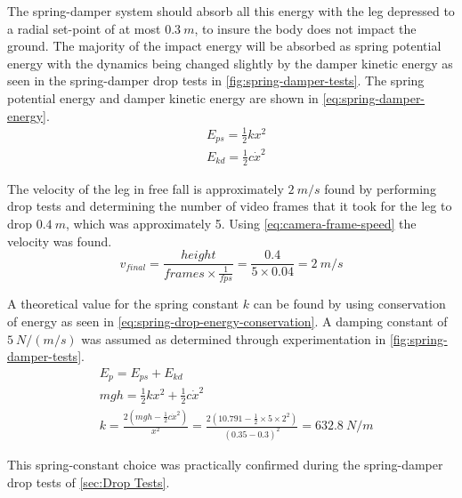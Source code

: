 The spring-damper system should absorb all this energy with the leg depressed to a radial set-point of at most $0.3\ m$, to insure the body does not impact the ground. The majority of the impact energy will be absorbed as spring potential energy with the dynamics being changed slightly by the damper kinetic energy as seen in the spring-damper drop tests in \cref{fig:spring-damper-tests}. The spring potential energy and damper kinetic energy are shown in \cref{eq:spring-damper-energy}.
\begin{equation} \label{eq:spring-damper-energy}
\begin{aligned}
&E_{ps} = \frac{1}{2}kx^2 \\
&E_{kd} = \frac{1}{2}c\dot{x}^2
\end{aligned}
\end{equation}

The velocity of the leg in free fall is approximately $2\ m/s$ found by performing drop tests and determining the number of video frames that it took for the leg to drop $0.4\ m$, which was approximately 5. Using \cref{eq:camera-frame-speed} the velocity was found.
\begin{equation} \label{eq:camera-frame-speed}
v_{final} = \frac{height}{frames \times \frac{1}{fps}} = \frac{0.4}{5 \times 0.04} = 2\ m/s
\end{equation}

A theoretical value for the spring constant $k$ can be found by using conservation of energy as seen in \cref{eq:spring-drop-energy-conservation}. A damping constant of $5\ N/(m/s)$ was assumed as determined through experimentation in \cref{fig:spring-damper-tests}.
\begin{equation} \label{eq:spring-drop-energy-conservation}
\begin{aligned}
&E_p = E_{ps} + E_{kd} \\
&mgh = \frac{1}{2}kx^2 + \frac{1}{2}c\dot{x}^2\\
&k = \frac{2(mgh - \frac{1}{2}c\dot{x}^2)}{x^2} = \frac{2(10.791 - \frac{1}{2}\times 5\times 2^2)}{(0.35-0.3)^2} = 632.8\ N/m
\end{aligned}
\end{equation}

This spring-constant choice was practically confirmed during the spring-damper drop tests of  \cref{sec:Drop Tests}.
